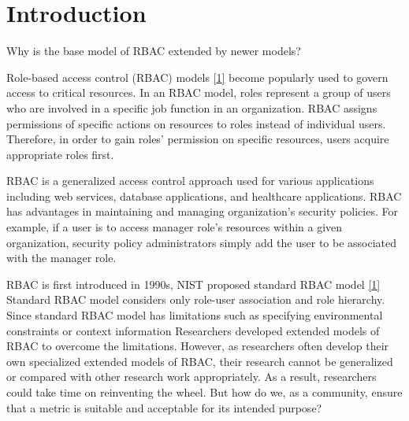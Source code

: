 \section{Introduction} \label{sec:introduction}

Why is the base model of RBAC extended by newer models?

Role-based access control (RBAC) models {\hyperref[intro:ferraiolo-rbac]{{[}1{]}}} become popularly used to govern access to critical resources.  In an RBAC model, roles represent a group of users who are involved in a specific job function in an organization. RBAC assigns permissions of specific actions on resources to roles instead of individual users.  Therefore, in order to gain roles' permission on specific resources, users acquire appropriate roles first.

RBAC is a generalized access control approach used for various applications including web services, database applications, and healthcare applications.  RBAC has advantages in maintaining and managing organization's security policies.  For example, if a user is to access manager role's resources within a given organization, security policy administrators simply add the user to be associated with the manager role.

RBAC is first introduced in 1990s, NIST proposed standard RBAC model {\hyperref[intro:ferraiolo-rbac]{{[}1{]}}}
Standard RBAC model considers only role-user association and role hierarchy.
Since standard RBAC model has limitations such as specifying environmental constraints or context information
Researchers developed extended models of RBAC to overcome the limitations.
However, as researchers often develop their own specialized extended models of RBAC,
their research cannot be generalized or compared with other research work appropriately.
As a result, researchers could take time on reinventing the wheel.
But how do we, as a community, ensure that a metric is suitable and acceptable for its intended purpose?

